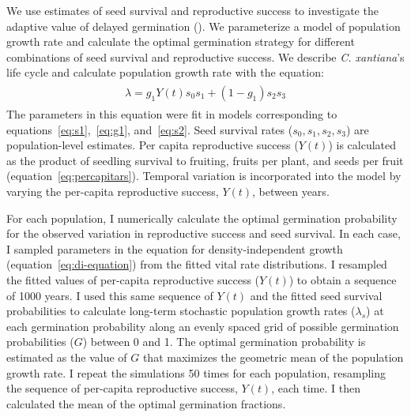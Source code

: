 \documentclass[12pt, oneside, titlepage]{article}   	%
\begin{document}
We use estimates of seed survival and reproductive success to investigate the adaptive value of delayed germination (\cite{gremer2014}). We parameterize a model of population growth rate and calculate the optimal germination strategy for different combinations of seed survival and reproductive success. We describe \textit{C. xantiana}'s life cycle and calculate population growth rate with the equation:
%
\begin{align}
  \begin{split}
\lambda = g_1 Y(t) s_0 s_1  + (1-g_1) s_2 s_3  \label{eq:di-equation}
  \end{split}
\end{align}
%
The parameters in this equation were fit in models corresponding to equations~\eqref{eq:s1},~\eqref{eq:g1}, and~\eqref{eq:s2}. Seed survival rates ($s_0, s_1, s_2, s_3$) are population-level estimates. Per capita reproductive success ($Y(t)$) is calculated as the product of seedling survival to fruiting, fruits per plant, and seeds per fruit (equation~\eqref{eq:percapitars}). Temporal variation is incorporated into the model by varying the per-capita reproductive success, $Y(t)$, between years.

For each population, I numerically calculate the optimal germination probability for the observed variation in reproductive success and seed survival. In each case, I sampled parameters in the equation for density-independent growth (equation~\eqref{eq:di-equation}) from the fitted vital rate distributions. I resampled the fitted values of per-capita reproductive success ($Y(t)$) to obtain a sequence of 1000 years. I used this same sequence of $Y(t)$ and the fitted seed survival probabilities to calculate long-term stochastic population growth rates ($\lambda_s$) at each germination probability along an evenly spaced grid of possible germination probabilities ($G$) between 0 and 1. The optimal germination probability is estimated as the value of $G$ that maximizes the geometric mean of the population growth rate. I repeat the simulations 50 times for each population, resampling the sequence of per-capita reproductive success, $Y(t)$, each time. I then calculated the mean of the optimal germination fractions.  

\end{document}
